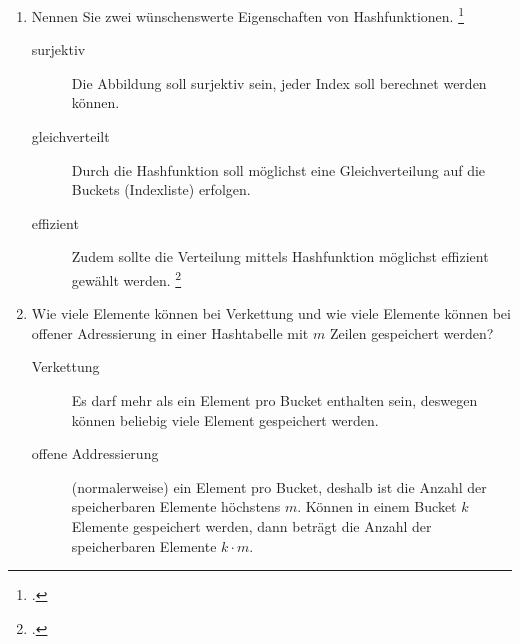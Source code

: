 \documentclass{bschlangaul-aufgabe}
\begin{document}

\begin{enumerate}


\item Nennen Sie zwei wünschenswerte Eigenschaften von Hashfunktionen.
\footcite{examen:66115:2021:03}

\begin{liAntwort}
\begin{description}
\item[surjektiv]

Die Abbildung soll surjektiv sein, \dh jeder Index soll berechnet werden
können.

\item[gleichverteilt]

Durch die Hashfunktion soll möglichst eine Gleichverteilung auf die
Buckets (Indexliste) erfolgen.

\item[effizient]

Zudem sollte die Verteilung mittels Hashfunktion möglichst effizient
gewählt werden.
\footcite{wiki:hashfunktion}
\end{description}
\end{liAntwort}


\item Wie viele Elemente können bei Verkettung und wie viele Elemente
können bei offener Adressierung in einer Hashtabelle mit $m$ Zeilen
gespeichert werden?

\begin{liAntwort}
\begin{description}
\item[Verkettung]

Es darf mehr als ein Element pro Bucket enthalten sein, deswegen können
beliebig viele Element gespeichert werden.

\item[offene Addressierung]

(normalerweise) ein Element pro Bucket, deshalb ist die Anzahl der
speicherbaren Elemente höchstens $m$. Können in einem Bucket $k$
Elemente gespeichert werden, dann beträgt die Anzahl der speicherbaren
Elemente $k \cdot m$.
\end{description}
\end{liAntwort}


\end{enumerate}
\end{document}
